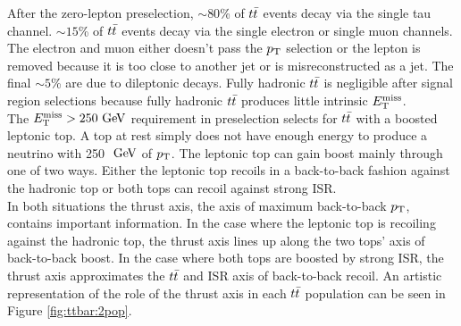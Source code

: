 \indent After the zero-lepton preselection, $\sim80$\% of $t\bar{t}$ events decay via the single tau channel.  $\sim15$\% of $t\bar{t}$ events decay via the single electron or single muon channels.  The electron and muon either doesn't pass the $p_{\mathrm{T}}$ selection or the lepton is removed because it is too close to another jet or is misreconstructed as a jet. The final $\sim5$\% are due to dileptonic decays. Fully hadronic $t\bar{t}$ is negligible after signal region selections because fully hadronic $t\bar{t}$ produces little intrinsic $E_{\mathrm{T}}^{\mathrm{miss}}$. \\

\indent  The $\met>250 \gev$ requirement in preselection selects for $t\bar{t}$ with a boosted leptonic top.  A top at rest simply does not have enough energy to produce a neutrino with 250 $\gev$ of $p_{\mathrm{T}}$. The leptonic top can gain boost mainly through one of two ways.  Either the leptonic top recoils in a back-to-back fashion against the hadronic top or both tops can recoil against strong ISR.  \\



\indent In both situations the thrust axis, the axis of maximum back-to-back $p_{\mathrm{T}}$, contains important information.  In the case where the leptonic top is recoiling against the hadronic top, the thrust axis lines up along the two tops' axis of back-to-back boost.  In the case where both tops are boosted by strong ISR, the thrust axis approximates the $t\bar{t}$ and ISR axis of back-to-back recoil. An artistic representation of the role of the thrust axis in each $t\bar{t}$ population can be seen in Figure \ref{fig:ttbar:2pop}. \\

